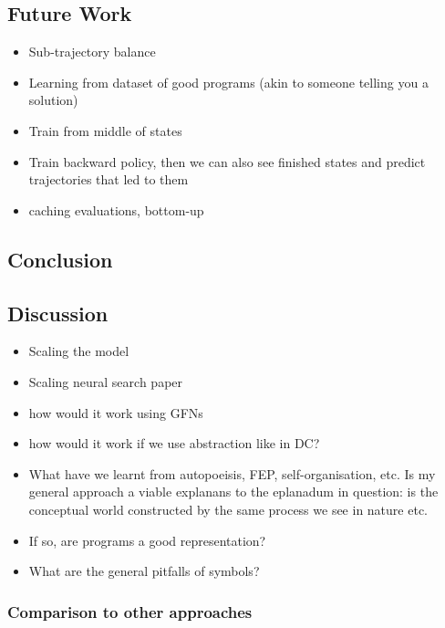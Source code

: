 \subsection{Future Work}
\begin{itemize}
    \item Sub-trajectory balance
    \item Learning from dataset of good programs (akin to someone telling you a solution)
    \item Train from middle of states
    \item Train backward policy, then we can also see finished states and predict trajectories that led to them
    \item caching evaluations, bottom-up
\end{itemize}












\subsection{Conclusion}

\subsection{Discussion}
\begin{itemize}
    \item Scaling the model 
    \item Scaling neural search paper
    \item how would it work using GFNs
    \item how would it work if we use abstraction like in DC? 
    \item What have we learnt from autopoeisis, FEP, self-organisation, etc. Is my general approach a viable explanans to the eplanadum in question: is the conceptual world constructed by the same process we see in nature etc.
    \item If so, are programs a good representation?
    \item What are the general pitfalls of symbols? 
\end{itemize}



\subsubsection{Comparison to other approaches}

